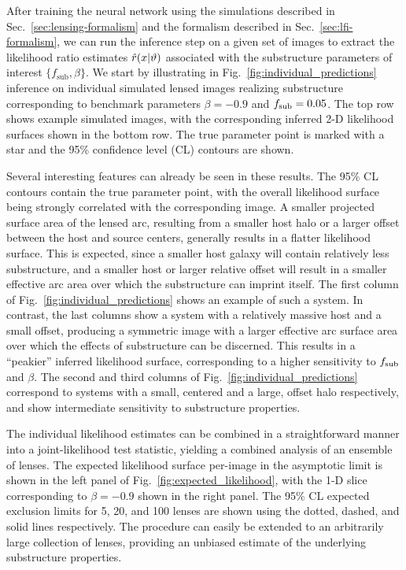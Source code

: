 \documentclass[twocolumn]{aastex62}
\begin{document}
After training the neural network using the simulations described in Sec.~\ref{sec:lensing-formalism} and the formalism described in Sec.~\ref{sec:lfi-formalism}, we can run the inference step on a given set of images to extract the likelihood ratio estimates $\hat r(x | \vartheta)$ associated with the substructure parameters of interest $\{f_\mathrm{sub}, \beta\}$. We start by illustrating in Fig.~\ref{fig:individual_predictions} inference on individual simulated lensed images realizing substructure corresponding to benchmark parameters $\beta = -0.9$ and $f_{\mathrm{sub}} = 0.05$. The top row shows example simulated images, with the corresponding inferred 2-D likelihood surfaces shown in the bottom row. The true parameter point is marked with a star and the 95\% confidence level (CL) contours are shown.

Several interesting features can already be seen in these results. The 95\% CL contours contain the true parameter point, with the overall likelihood surface being strongly correlated with the corresponding image. A smaller projected surface area of the lensed arc, resulting from a smaller host halo or a larger offset between the host and source centers, generally results in a flatter likelihood surface. This is expected, since a smaller host galaxy will contain relatively less substructure, and a smaller host or larger relative offset will result in a smaller effective arc area over which the substructure can imprint itself. The first column of Fig.~\ref{fig:individual_predictions} shows an example of such a system. In contrast, the last columns show a system with a relatively massive host and a small offset, producing a symmetric image with a larger effective arc surface area over which the effects of substructure can be discerned. This results in a ``peakier'' inferred likelihood surface, corresponding to a higher sensitivity to $f_{\mathrm{sub}}$ and $\beta$. The second and third columns of Fig.~\ref{fig:individual_predictions} correspond to systems with a small, centered and a large, offset halo respectively, and show intermediate sensitivity to substructure properties.

The individual likelihood estimates can be combined in a straightforward manner into a joint-likelihood test statistic, yielding a combined analysis of an ensemble of lenses. The expected likelihood surface per-image in the asymptotic limit is shown in the left panel of Fig.~\ref{fig:expected_likelihood}, with the 1-D slice corresponding to $\beta = -0.9$ shown in the right panel. The 95\% CL expected exclusion limits for 5, 20, and 100 lenses are shown using the dotted, dashed, and solid lines respectively. The procedure can easily be extended to an arbitrarily large collection of lenses, providing an unbiased estimate of the underlying substructure properties.
\end{document}
